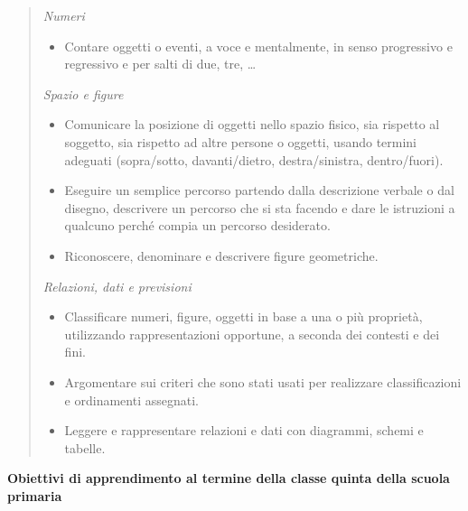 \documentclass[12pt]{report}
\begin{document}
 \begin{quote}
\medskip
\textit{Numeri}

\begin{itemize}
\item Contare oggetti o eventi, a voce e mentalmente, in senso progressivo e regressivo e per salti di due, tre, …
\end{itemize}

\medskip
\textit{Spazio e figure}
\begin{itemize}
\item Comunicare la posizione di oggetti nello spazio fisico, sia rispetto al soggetto, sia rispetto ad altre persone o oggetti, usando termini adeguati (sopra/sotto, davanti/dietro, destra/sinistra, dentro/fuori).

\item Eseguire un semplice percorso partendo dalla descrizione verbale o dal disegno, descrivere un percorso che si sta facendo e dare le istruzioni a qualcuno perché compia un percorso desiderato.

\item Riconoscere, denominare e descrivere figure geometriche.
\end{itemize}

\medskip
\textit{Relazioni, dati e previsioni}
\begin{itemize}
\item Classificare numeri, figure, oggetti in base a una o più proprietà, utilizzando rappresentazioni opportune, a seconda dei contesti e dei fini.

\item Argomentare sui criteri che sono stati usati per realizzare classificazioni e ordinamenti assegnati.

\item Leggere e rappresentare relazioni e dati con diagrammi, schemi e tabelle.
\end{itemize}
\end{quote}

\medskip
\noindent \textbf{Obiettivi di apprendimento al termine della classe quinta della scuola primaria}
\end{document}
